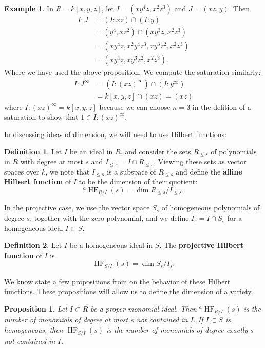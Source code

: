 \documentclass[11pt]{article}
\DeclareMathOperator{\HF}{HF}
\newtheorem{proposition}{Proposition}
\theoremstyle{definition}
\newtheorem{definition}{Definition}
\newtheorem{example}{Example}
\begin{document}
\begin{example}
	In $R = k[x,y,z]$, let $I = (xy^4z, x^2z^3)$ and $J = (xz,y)$. Then \begin{align*}
		I : J &= (I : xz) \cap (I : y) \\
		&= (y^4, xz^2) \cap (xy^3z, x^2 z^3) \\
		&= (xy^4z, x^2y^4z^3, xy^3z^2, x^2z^3) \\
		&= (xy^4z, xy^3z^2, x^2z^3).
	\end{align*} Where we have used the above proposition. We compute the saturation similarly: \begin{align*}
		I : J^\infty &= (I : (xz)^\infty) \cap (I : y^\infty) \\
		&= k[x,y,z] \cap (xz) = (xz)
	\end{align*} where $I: (xz)^\infty = k[x,y,z]$ because we can choose $n = 3$ in the defition of a saturation to show that $1 \in I : (xz)^\infty$. 
\end{example}


In discussing ideas of dimension, we will need to use Hilbert functions: 


\begin{definition}
	Let $I$ be an ideal in $R$, and consider the sets $R_{\leq s}$ of polynomials in $R$ with degree at most $s$ and $I_{\leq s} = I \cap R_{\leq s}$. Viewing these sets as vector spaces over $k$, we note that $I_{\leq s}$ is a subspace of $R_{\leq s}$ and define the \textbf{affine Hilbert function} of $I$ to be the dimension of their quotient: \[ ^a\HF_{R/I}(s) = \dim R_{\leq s} / I_{\leq s}. \] 
\end{definition}

In the projective case, we use the vector space $S_s$ of homogeneous polynomials of degree $s$, together with the zero polynomial, and we define $I_s = I \cap S_s$ for a homogeneous ideal $I \subset S$. 

\begin{definition}
	Let $I$ be a homogeneous ideal in $S$. The \textbf{projective Hilbert function} of $I$ is \[ \HF_{S/I}(s) = \dim S_s/I_s.  \]
\end{definition}


We know state a few propositions from \cite{cox2013ideals} on the behavior of these Hilbert functions. These propositions will allow us to define the dimension of a variety. 


\begin{proposition}
	Let $I \subset R$ be a proper monomial ideal. Then $^a\HF_{R/I}(s)$ is the number of monomials of degree at most $s$ not contained in $I$. If $I \subset S$ is homogeneous, then $\HF_{S/I}(s)$ is the number of monomials of degree exactly $s$ not contained in $I$. 
\end{proposition}
\end{document}
